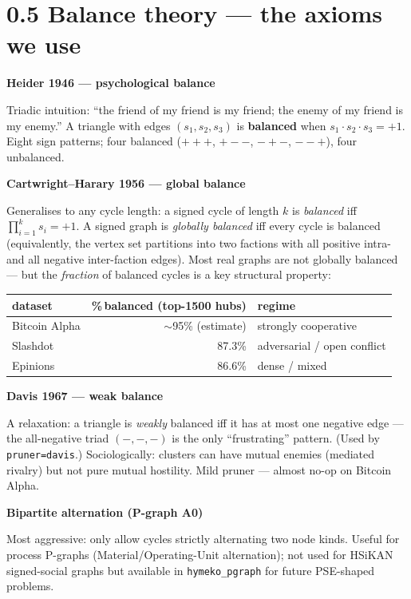 \documentclass[11pt,a4paper]{article}
\newcommand{\code}[1]{\texttt{\small #1}}
\newcommand{\sect}[1]{\par\medskip\noindent\textbf{\color{deepblue}#1}\par\nopagebreak}
\begin{document}
\section*{0.5 Balance theory — the axioms we use}

\sect{Heider 1946 — psychological balance}
Triadic intuition: ``the friend of my friend is my friend; the enemy
of my friend is my enemy.'' A triangle with edges $(s_1, s_2, s_3)$
is \textbf{balanced} when
\(s_1 \cdot s_2 \cdot s_3 = +1\). Eight sign patterns; four
balanced ($+++$, $+--$, $-+-$, $--+$), four unbalanced.

\sect{Cartwright–Harary 1956 — global balance}
Generalises to any cycle length: a signed cycle of length $k$ is
\emph{balanced} iff $\prod_{i=1}^{k} s_i = +1$. A signed graph is
\emph{globally balanced} iff every cycle is balanced (equivalently,
the vertex set partitions into two factions with all positive
intra- and all negative inter-faction edges). Most real graphs are
not globally balanced --- but the \emph{fraction} of balanced cycles
is a key structural property:

\begin{center}
\begin{tabular}{lrl}
\toprule
dataset            & \%\,balanced (top-1500 hubs) & regime \\
\midrule
Bitcoin Alpha      & $\sim$95\% (estimate)        & strongly cooperative \\
Slashdot           & 87.3\%                       & adversarial / open conflict \\
Epinions           & 86.6\%                       & dense / mixed \\
\bottomrule
\end{tabular}
\end{center}

\sect{Davis 1967 — weak balance}
A relaxation: a triangle is \emph{weakly} balanced iff it has at most
one negative edge --- the all-negative triad $(-,-,-)$ is the only
``frustrating'' pattern. (Used by \code{pruner=davis}.) Sociologically:
clusters can have mutual enemies (mediated rivalry) but not pure
mutual hostility. Mild pruner --- almost no-op on Bitcoin Alpha.

\sect{Bipartite alternation (P-graph A0)}
Most aggressive: only allow cycles strictly alternating two node
kinds. Useful for process P-graphs (Material/Operating-Unit
alternation); not used for HSiKAN signed-social graphs but available
in \code{hymeko\_pgraph} for future PSE-shaped problems.
\end{document}
